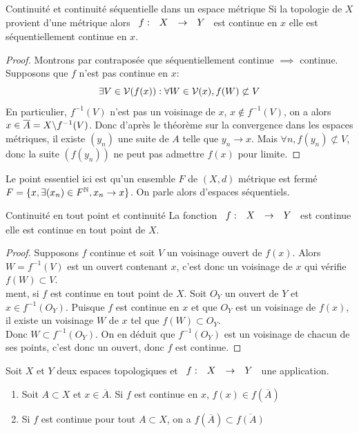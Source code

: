 \documentclass[]{report}
\begin{document}
    \begin{tm}{Continuité et continuité séquentielle dans un espace métrique}{}
        Si la topologie de $X$ provient d'une métrique alors $\begin{array}{ccccc} f : & X & \to & Y \end{array}$ est continue en $x$ \ssi elle est séquentiellement continue en $x$.
    \end{tm}

    \begin{proof}{}{}
        Montrons par contraposée que séquentiellement continue $\implies$ continue.\\
        Supposons que $f$ n'est pas continue en $x$:
        \[\exists V\in\mathcal{V}(f(x)):\forall W\in\mathcal{V}(x),f(W)\not\subset V\]
        En particulier, $f^{-1}(V)$ n'est pas un voisinage de $x$, $x\not\in f^{-1}(V)$, on a alors $x\in\overline{A}=X\backslash f^{-1}(V)$. Donc d'après le théorème sur la convergence dans les espaces métriques, il existe $(y_n)$ une suite de $A$ telle que $y_n\to x$. Mais $\forall n,f(y_n)\not\subset V$, donc la suite $(f(y_n))$ ne peut pas admettre $f(x)$ pour limite.
    \end{proof}

    \begin{re}{}{}
        Le point essentiel ici est qu'un ensemble $F$ de $(X,d)$ métrique est fermé \ssi $F=\{x,\exists(x_n)\in F^{\mathbb{N}},x_n\to x\}$. On parle alors d'espaces séquentiels.
    \end{re}

    \begin{tm}{Continuité en tout point et continuité}{}
        La fonction $\begin{array}{ccccc} f : & X & \to & Y \end{array}$ est continue \ssi elle est continue en tout point de $X$.
    \end{tm}

    \begin{proof}{}{}
        Supposons $f$ continue et soit $V$ un voisinage ouvert de $f(x)$. Alors $W=f^{-1}(V)$ est un ouvert contenant $x$, c'est donc un voisinage de $x$ qui vérifie $f(W)\subset V$.\\
        ment, si $f$ est continue en tout point de $X$. Soit $O_Y$ un ouvert de $Y$ et $x\in f^{-1}(O_Y)$. Puisque $f$ est continue en $x$ et que $O_Y$ est un voisinage de $f(x)$, il existe un voisinage $W$ de $x$ tel que $f(W)\subset O_Y$.\\
        Donc $W\subset f^{-1}(O_Y)$. On en déduit que $f^{-1}(O_Y)$ est un voisinage de chacun de ses points, c'est donc un ouvert, donc $f$ est continue.
    \end{proof}

    \begin{prop}{}{}
        Soit $X$ et $Y$ deux espaces topologiques et $\begin{array}{ccccc} f : & X & \to & Y \end{array}$ une application.
        \begin{enumerate}
            \item Soit $A\subset X$ et $x\in\overline{A}$. Si $f$ est continue en $x$, $f(x)\in f(\overline{A})$
            \item Si $f$ est continue pour tout $A\subset X$, on a $f(\overline{A})\subset \overline{f(A)}$
        \end{enumerate}
    \end{prop}
\end{document}
